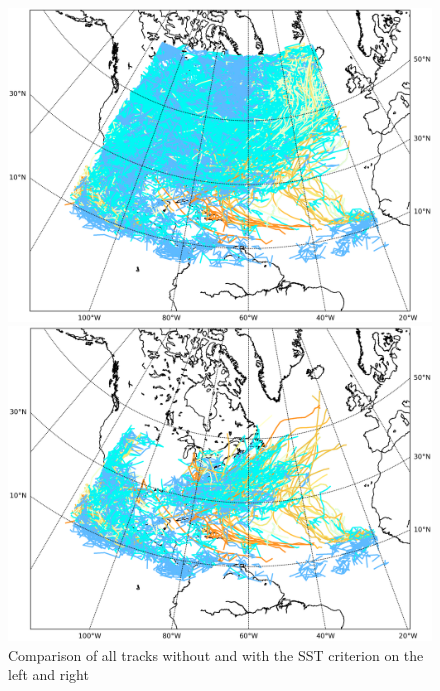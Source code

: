 \begin{figure}[ht]
	\begin{minipage}[t]{0.48\textwidth}
		\includegraphics[width = \textwidth]{img/all_tracks.png}
	\end{minipage}
	\hfill
	\begin{minipage}[t]{0.48\textwidth}
		\includegraphics[width = \textwidth]{img/all_tracks_sst.png}
	\end{minipage}
	\caption{Comparison of all tracks without and with the SST criterion on the left and right}
	\label{fig:sst-effect}
\end{figure}

